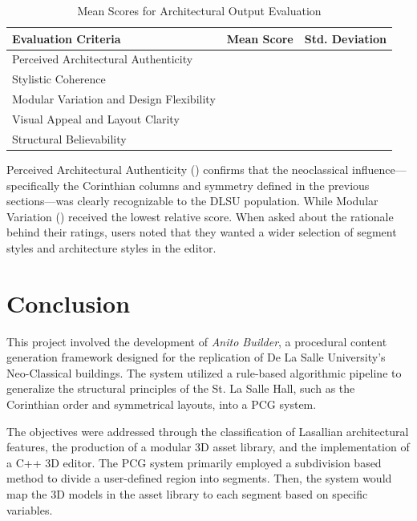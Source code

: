 \documentclass[manuscript,screen,12pt]{article}
\begin{document}
\begin{table}[h!]
	\centering
	\caption{Mean Scores for Architectural Output Evaluation}
	\begin{tabular}{|p{7cm}|c|c|}
		\hline
		\textbf{Evaluation Criteria} & \textbf{Mean Score} & \textbf{Std. Deviation} \\ \hline
		Perceived Architectural Authenticity     & \meanAuth & \sdAuth \\ \hline
		Stylistic Coherence                      & \meanCohere & \sdCohere \\ \hline
		Modular Variation and Design Flexibility & \meanVar & \sdVar \\ \hline
		Visual Appeal and Layout Clarity         & \meanAppeal & \sdAppeal \\ \hline
		Structural Believability                 & \meanBelieve & \sdBelieve \\ \hline
	\end{tabular}
\end{table}

Perceived Architectural Authenticity (\meanAuth) confirms that the neoclassical influence—specifically the Corinthian columns and symmetry defined in the previous sections—was clearly recognizable to the DLSU population. While Modular Variation (\meanVar) received the lowest relative score. When asked about the rationale behind their ratings, users noted that they wanted a wider selection of segment styles and architecture styles in the editor.

\newpage
\section{Conclusion}

This project involved the development of \textit{Anito Builder}, a procedural content generation framework designed for the replication of De La Salle University’s Neo-Classical buildings. The system utilized a rule-based algorithmic pipeline to generalize the structural principles of the St. La Salle Hall, such as the Corinthian order and symmetrical layouts, into a PCG system. 

The objectives were addressed through the classification of Lasallian architectural features, the production of a modular 3D asset library, and the implementation of a C++ 3D editor. The PCG system primarily employed a subdivision based method to divide a user-defined region into segments. Then, the system would map the 3D models in the asset library to each segment based on specific variables.
\end{document}
